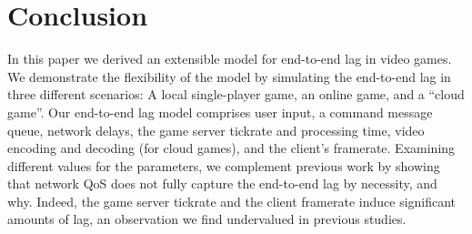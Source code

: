 \section{Conclusion}
\label{sec:conclusion}


In this paper we derived an extensible model for end-to-end lag in video games. We demonstrate the flexibility of the model by simulating the end-to-end lag in three different scenarios: A local single-player game, an online game, and a ``cloud game''. 
Our end-to-end lag model comprises user input, a command message queue, network delays, the game server tickrate and processing time, video encoding and decoding (for cloud games), and the client's framerate. Examining different values for the parameters, we complement previous work by showing that network \acrfull{QoS} does not fully capture the end-to-end lag by necessity, and why. Indeed, the game server tickrate and the client framerate induce significant amounts of lag, an observation we find undervalued in previous studies.



